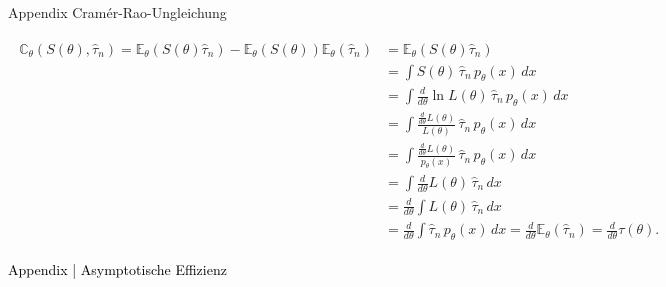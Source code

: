 \documentclass[
  8pt,
  ignorenonframetext,
]{beamer}
\begin{document}
\begin{frame}{Appendix \textbar{} Cramér-Rao-Ungleichung}
\protect\hypertarget{appendix-cramuxe9r-rao-ungleichung-19}{}
\begin{tiny}
\begin{align}
\begin{split}
\mathbb{C}_\theta(S(\theta),\hat{\tau}_n)
  = \mathbb{E}_\theta(S(\theta)\hat{\tau}_n)
   - \mathbb{E}_\theta(S(\theta))\mathbb{E}_\theta(\hat{\tau}_n)
&  = \mathbb{E}_\theta(S(\theta)\hat{\tau}_n) \\
& = \int S(\theta)\,\hat{\tau}_n\,p_\theta(x) \,dx \\
& = \int \frac{d}{d\theta} \ln L(\theta)\,\hat{\tau}_n\,p_\theta(x) \,dx \\
& = \int \frac{\frac{d}{d\theta} L(\theta)}{L(\theta)}\,\hat{\tau}_n\,p_\theta(x) \,dx \\
& = \int \frac{\frac{d}{d\theta} L(\theta)}{p_\theta(x)}\,\hat{\tau}_n\,p_\theta(x) \,dx \\
& = \int \frac{d}{d\theta} L(\theta)\, \hat{\tau}_n  \,dx \\
& = \frac{d}{d\theta} \int L(\theta)\, \hat{\tau}_n  \,dx \\
& = \frac{d}{d\theta} \int \hat{\tau}_n\, p_\theta(x) \,dx
  = \frac{d}{d\theta} \mathbb{E}_\theta(\hat{\tau}_n)
  = \frac{d}{d\theta} \tau(\theta).
\end{split}
\end{align}
\end{tiny}
\end{frame}

\begin{frame}[plain]{}
\protect\hypertarget{section-14}{}
\vfill
\center
\huge

\textcolor{black}{Appendix | Asymptotische Effizienz} \vfill
\end{frame}
\end{document}
